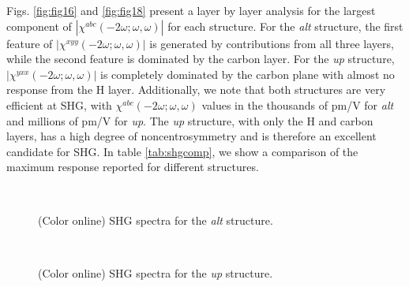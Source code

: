 \documentclass[pss]{wiley2sp} %
\begin{document}
Figs. \ref{fig:fig16} and \ref{fig:fig18} present a layer by layer
analysis for the largest component of $|\chi^{abc}(-2\omega;\omega,\omega)|$
for each structure. For the \emph{alt} structure, the first feature of
$|\chi^{xyy}(-2\omega;\omega,\omega)|$ is generated by contributions from all
three layers, while the second feature is dominated by the carbon layer. For the
\emph{up} structure, $|\chi^{yxx}(-2\omega;\omega,\omega)|$ is completely
dominated by the carbon plane with almost no response from the H layer.
Additionally, we note that both structures are very efficient at SHG, with
$\chi^{abc}(-2\omega;\omega,\omega)$ values in the thousands of pm/V for
\emph{alt} and millions of pm/V for \emph{up}. The \emph{up} structure, with
only the H and carbon layers, has a high degree of noncentrosymmetry and is
therefore an excellent candidate for SHG. In table \ref{tab:shgcomp}, we show a
comparison of the maximum response reported for different structures.


\begin{figure}[t]
\\
\caption{(Color online) SHG spectra for the \emph{alt} structure.
\label{fig:fig15}}
\end{figure}


\begin{figure}[t]

\\
\caption{(Color online) SHG spectra for the \emph{up} structure.
\label{fig:fig17}}
\end{figure}
\end{document}
